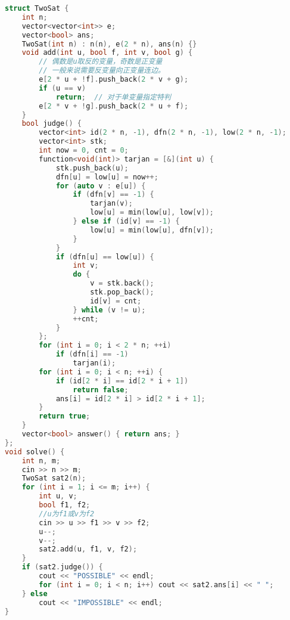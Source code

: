 \begin{lstlisting}[language=C++]
struct TwoSat {
    int n;
    vector<vector<int>> e;
    vector<bool> ans;
    TwoSat(int n) : n(n), e(2 * n), ans(n) {}
    void add(int u, bool f, int v, bool g) {
        // 偶数是u取反的变量，奇数是正变量
        // 一般来说需要反变量向正变量连边。
        e[2 * u + !f].push_back(2 * v + g);
        if (u == v)
            return;  // 对于单变量指定特判
        e[2 * v + !g].push_back(2 * u + f);
    }
    bool judge() {
        vector<int> id(2 * n, -1), dfn(2 * n, -1), low(2 * n, -1);
        vector<int> stk;
        int now = 0, cnt = 0;
        function<void(int)> tarjan = [&](int u) {
            stk.push_back(u);
            dfn[u] = low[u] = now++;
            for (auto v : e[u]) {
                if (dfn[v] == -1) {
                    tarjan(v);
                    low[u] = min(low[u], low[v]);
                } else if (id[v] == -1) {
                    low[u] = min(low[u], dfn[v]);
                }
            }
            if (dfn[u] == low[u]) {
                int v;
                do {
                    v = stk.back();
                    stk.pop_back();
                    id[v] = cnt;
                } while (v != u);
                ++cnt;
            }
        };
        for (int i = 0; i < 2 * n; ++i)
            if (dfn[i] == -1)
                tarjan(i);
        for (int i = 0; i < n; ++i) {
            if (id[2 * i] == id[2 * i + 1])
                return false;
            ans[i] = id[2 * i] > id[2 * i + 1];
        }
        return true;
    }
    vector<bool> answer() { return ans; }
};
void solve() {
    int n, m;
    cin >> n >> m;
    TwoSat sat2(n);
    for (int i = 1; i <= m; i++) {
        int u, v;
        bool f1, f2;
        //u为f1或v为f2
        cin >> u >> f1 >> v >> f2;
        u--;
        v--;
        sat2.add(u, f1, v, f2);
    }
    if (sat2.judge()) {
        cout << "POSSIBLE" << endl;
        for (int i = 0; i < n; i++) cout << sat2.ans[i] << " ";
    } else
        cout << "IMPOSSIBLE" << endl;
}

\end{lstlisting}
